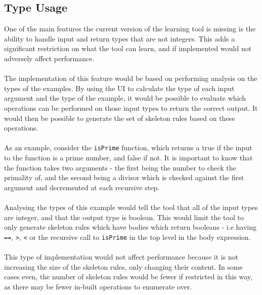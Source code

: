 \subsection{Type Usage}
One of the main features the current version of the learning tool is missing is the ability to handle input and return types that are not integers. This adds a significant restriction on what the tool can learn, and if implemented would not adversely affect performance. \\ \\
The implementation of this feature would be based on performing analysis on the types of the examples. By using the UI to calculate the type of each input argument and the type of the example, it would be possible to evaluate which operations can be performed on those input types to return the correct output. It would then be possible to generate the set of skeleton rules based on these operations. \\ \\
As an example, consider the \lstinline{isPrime} function, which returns a true if the input to the function is a prime number, and false if not. It is important to know that the function takes two arguments - the first being the number to check the primality of, and the second being a divisor which is checked against the first argument and decremented at each recursive step. \\ \\ %
Analysing the types of this example would tell the tool that all of the input types are integer, and that the output type is boolean. This would limit the tool to only generate skeleton rules which have bodies which return booleans - i.e having \lstinline{==}, \lstinline{>}, \lstinline{<} or the recursive call to \lstinline{isPrime} in the top level in the body expression. \\ \\
This type of implementation would not affect performance because it is not increasing the size of the skeleton rules, only changing their content. In some cases even, the number of skeleton rules would be fewer if restricted in this way, as there may be fewer in-built operations to enumerate over.

